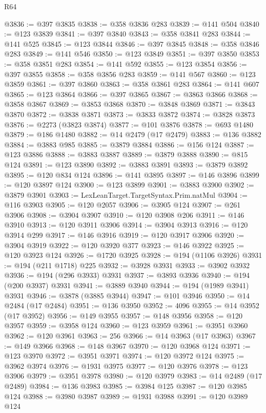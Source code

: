 \begin{lexlean}{R64}
\begin{coremodule}
@3836 := @397 @3835
@3838 := @358 @3836 @283
@3839 := @141 @504
@3840 := @123 @3839
@3841 := @397 @3840
@3843 := @358 @3841 @283
@3844 := @141 @525
@3845 := @123 @3844
@3846 := @397 @3845
@3848 := @358 @3846 @283
@3849 := @141 @546
@3850 := @123 @3849
@3851 := @397 @3850
@3853 := @358 @3851 @283
@3854 := @141 @592
@3855 := @123 @3854
@3856 := @397 @3855
@3858 := @358 @3856 @283
@3859 := @141 @567
@3860 := @123 @3859
@3861 := @397 @3860
@3863 := @358 @3861 @283
@3864 := @141 @607
@3865 := @123 @3864
@3866 := @397 @3865
@3867 := @3863 @3866
@3868 := @3858 @3867
@3869 := @3853 @3868
@3870 := @3848 @3869
@3871 := @3843 @3870
@3872 := @3838 @3871
@3873 := @3833 @3872
@3874 := @3828 @3873
@3876 := @2273 (@3823 @3874)
@3877 := @101 @3876
@3878 := @693 @1480
@3879 := @186 @1480
@3882 := @14 @2479 (@17 @2479)
@3883 := @136 @3882
@3884 := @3883 @985
@3885 := @3879 @3884
@3886 := @156 @124
@3887 := @123 @3886
@3888 := @3883 @3887
@3889 := @3879 @3888
@3890 := @815 @124
@3891 := @123 @3890
@3892 := @3883 @3891
@3893 := @3879 @3892
@3895 := @120 @834 @124
@3896 := @141 @3895
@3897 := @146 @3896
@3899 := @120 @3897 @124
@3900 := @123 @3899
@3901 := @3883 @3900
@3902 := @3879 @3901
@3903 := LexLeanTarget.TargetSyntax.Prim.natMul
@3904 := @116 @3903
@3905 := @120 @2057
@3906 := @3905 @124
@3907 := @261 @3906
@3908 := @3904 @3907
@3910 := @120 @3908 @206
@3911 := @146 @3910
@3913 := @120 @3911 @3906
@3914 := @3904 @3913
@3916 := @120 @3914 @299
@3917 := @146 @3916
@3919 := @120 @3917 @3906
@3920 := @3904 @3919
@3922 := @120 @3920 @377
@3923 := @146 @3922
@3925 := @120 @3923 @124
@3926 := @1720 @3925
@3928 := @194 (@1106 @3926)
@3931 := @194 (@211 @1718) @225
@3932 := @3928 @3931
@3933 := @3902 @3932
@3936 := @194 (@296 @3933) @3931
@3937 := @3893 @3936
@3940 := @194 (@200 @3937) @3931
@3941 := @3889 @3940
@3944 := @194 (@1989 @3941) @3931
@3946 := @3878 (@3885 @3944)
@3947 := @101 @3946
@3950 := @14 @2484 (@17 @2484)
@3951 := @136 @3950
@3952 := 4096
@3955 := @14 @3952 (@17 @3952)
@3956 := @149 @3955
@3957 := @148 @3956
@3958 := @120 @3957
@3959 := @3958 @124
@3960 := @123 @3959
@3961 := @3951 @3960
@3962 := @120 @3961
@3963 := 256
@3966 := @14 @3963 (@17 @3963)
@3967 := @149 @3966
@3968 := @148 @3967
@3970 := @120 @3968 @124
@3971 := @123 @3970
@3972 := @3951 @3971
@3974 := @120 @3972 @124
@3975 := @3962 @3974
@3976 := @1931 @3975
@3977 := @120 @3976
@3978 := @123 @3906
@3979 := @3951 @3978
@3980 := @120 @3979
@3983 := @14 @2489 (@17 @2489)
@3984 := @136 @3983
@3985 := @3984 @125
@3987 := @120 @3985 @124
@3988 := @3980 @3987
@3989 := @1931 @3988
@3991 := @120 @3989 @124

\end{coremodule}
\end{lexlean}
